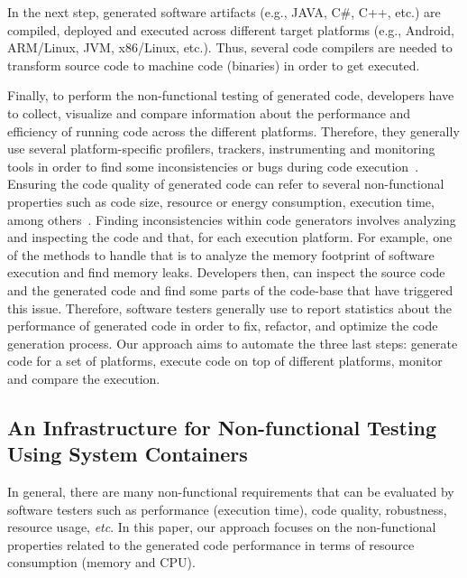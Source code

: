 In the next step, generated software artifacts (e.g., JAVA, C\#, C++, etc.) are compiled, deployed and executed across different target platforms (e.g., Android, ARM/Linux, JVM, x86/Linux, etc.). Thus, several code compilers are needed to transform source code to machine code (binaries) in order to get executed. 

Finally, to perform the non-functional testing of generated code, developers have to collect, visualize and compare information about the performance and efficiency of running code across the different platforms. 
Therefore, they generally use several platform-specific profilers, trackers, instrumenting and monitoring tools in order to find some inconsistencies or bugs during code execution~\cite{guana2014chaintracker,delgado2004taxonomy}. Ensuring the code quality of generated code can refer to several non-functional properties such as code size, resource or energy consumption, execution time, among others~\cite{pan2006fast}. Finding inconsistencies within code generators involves analyzing and inspecting the code and that, for each execution platform. For example, one of the methods to handle that is to analyze the memory footprint of software execution and find memory leaks. Developers then, can inspect the source code and the generated code and find some parts of the code-base that have triggered this issue. %
Therefore, software testers generally use to report statistics about the performance of generated code in order to fix, refactor, and optimize the code generation process. Our approach aims to automate the three last steps: generate code for a set of platforms, execute code on top of different platforms, monitor and compare the execution. 

\subsection{An Infrastructure for Non-functional Testing Using System Containers}
In general, there are many non-functional requirements that can be evaluated by software testers such as performance (execution time), code quality, robustness, resource usage, \textit{etc}. In this paper, our approach focuses on the non-functional properties related to the generated code performance in terms of resource consumption (memory and CPU).

